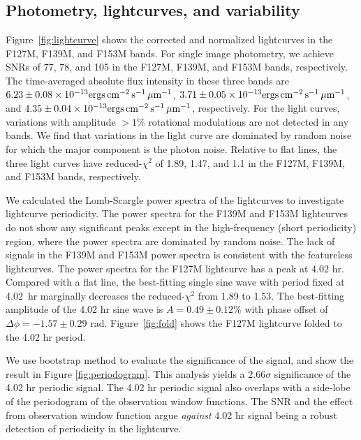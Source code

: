 \documentclass[twocolumn]{aastex62}
\begin{document}
\subsection{Photometry, lightcurves, and variability}
\newcommand{\fluxunit}{\ensuremath{\mathrm{ergs}\,\mathrm{cm^{-2}}\,\mathrm{s^{-1}}\,\mathrm{\micron^{{-1}}}}}
Figure~\ref{fig:lightcurve} shows the corrected and normalized lightcurves in the F127M, F139M, and F153M bands. For single image photometry, we achieve  SNRs of  77, 78, and 105 in the F127M, F139M, and F153M bands, respectively. The time-averaged absolute flux intensity in these three bands are $6.23\pm0.08\times10^{-13}\fluxunit$, $3.71\pm0.05\times10^{-13}\fluxunit$, and $4.35\pm0.04\times10^{{-13}}\fluxunit$, respectively.
For the light curves, variations with amplitude $>1\%$ rotational modulations are not detected in any bands. We find that variations in the light curve are dominated by random noise for which the major component is the photon noise. Relative to flat lines, the three light curves have reduced-$\chi^{2}$ of 1.89, 1.47, and 1.1 in the F127M, F139M, and F153M bands, respectively.

We calculated the Lomb-Scargle power spectra \citep[][Figure~\ref{fig:periodogram}]{Lomb1976} of the lightcurves to investigate lightcurve periodicity. The power spectra for the F139M and F153M lightcurves do not show any significant peaks except in the high-frequency (short periodicity) region, where the power spectra are dominated by random noise. The lack of signals in the F139M and F153M power spectra is consistent with the featureless lightcurves. The power spectra for the F127M lightcurve has a peak at 4.02 hr. Compared with a flat line, the best-fitting single sine wave with period fixed at 4.02~hr marginally decreases the reduced-$\chi^{2}$ from 1.89 to 1.53. The best-fitting amplitude of the 4.02 hr sine wave is $A = 0.49\pm0.12\%$ with phase offset of $\Delta \phi = -1.57\pm0.29$ rad. Figure~\ref{fig:fold} shows the F127M lightcurve folded to the 4.02 hr period.

We use bootstrap method \citep{Manjavacas2017,Zhou2019} to evaluate the significance of the signal, and show the result in Figure \ref{fig:periodogram}. This analysis yields a $2.66\sigma$ significance of the 4.02 hr periodic signal. The 4.02 hr periodic signal also overlaps with a side-lobe of the periodogram of the observation window functions. The SNR and the effect from observation window function argue \emph{against} 4.02 hr signal being a robust detection of periodicity in the lightcurve.
\end{document}
